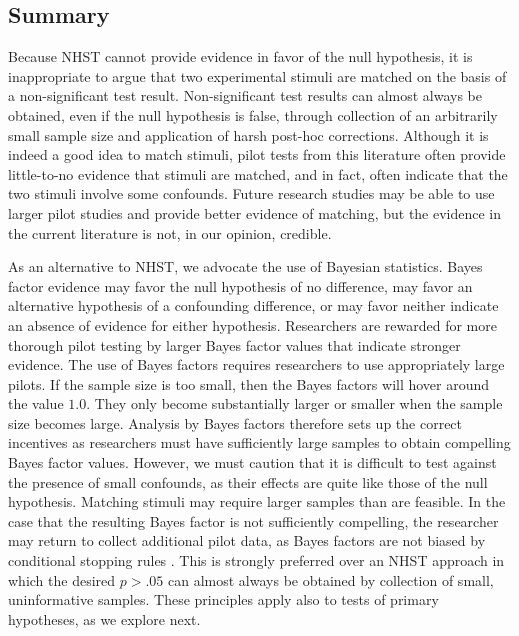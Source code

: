 \documentclass[man]{apa6}
\begin{document}
\subsection{Summary}
Because NHST cannot provide evidence in favor of the null hypothesis, it is inappropriate to argue that two experimental stimuli are matched on the basis of a non-significant test result.  Non-significant test results can almost always be obtained, even if the null hypothesis is false, through collection of an arbitrarily small sample size and application of harsh post-hoc corrections.  Although it is indeed a good idea to match stimuli, pilot tests from this literature often provide little-to-no evidence that stimuli are matched, and in fact, often indicate that the two stimuli involve some confounds. Future research studies may be able to use larger pilot studies and provide better evidence of matching, but the evidence in the current literature is not, in our opinion, credible. %
 
As an alternative to NHST, we advocate the use of Bayesian statistics. Bayes factor evidence may favor the null hypothesis of no difference, may favor an alternative hypothesis of a confounding difference, or may favor neither indicate an absence of evidence for either hypothesis. Researchers are rewarded for more thorough pilot testing by larger Bayes factor values that indicate stronger evidence. The use of Bayes factors requires researchers to use appropriately large pilots.  If the sample size is too small, then the Bayes factors will hover around the value $1.0$.  They only become substantially larger or smaller when the sample size becomes large.  Analysis by Bayes factors therefore sets up the correct incentives as researchers must have sufficiently large samples to obtain compelling Bayes factor values. However, we must caution that it is difficult to test against the presence of small confounds, as their effects are quite like those of the null hypothesis. Matching stimuli may require larger samples than are feasible. In the case that the resulting Bayes factor is not sufficiently compelling, the researcher may return to collect additional pilot data, as Bayes factors are not biased by conditional stopping rules \citep{Rouder:2014}. This is strongly preferred over an NHST approach in which the desired $p > .05$ can almost always be obtained by collection of small, uninformative samples. These principles apply also to tests of primary hypotheses, as we explore next.
\end{document}
